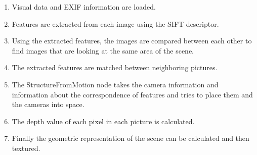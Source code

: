 \begin{enumerate}

\item Visual data and EXIF information are loaded.
\item Features are extracted from each image using the SIFT descriptor.
\item Using the extracted features, the images are compared between each other to find images that are looking at the same area of the scene.
\item The extracted features are matched between neighboring pictures.
\item The StructureFromMotion node takes the camera information and information about the correspondence of features and tries to place them and the cameras into space.
\item The depth value of each pixel in each picture is calculated.
\item Finally the geometric representation of the scene can be calculated and then textured.

\end{enumerate}









\endinput